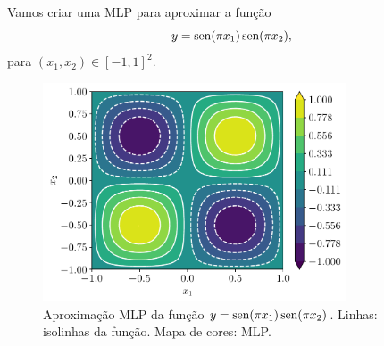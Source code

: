 Vamos criar uma MLP para aproximar a função
\begin{equation}
  y = \operatorname{sen}(\pi x_1)\operatorname{sen}(\pi x_2),
\end{equation}
para $(x_1, x_2) \in [-1, 1]^2$.

\begin{figure}[H]
  \centering
  \includegraphics[width=0.8\textwidth]{cap_mlp/dados/fig_mlp_apfun_2d/fig}
  \caption{Aproximação MLP da função $y = \operatorname{sen}(\pi x_1)\operatorname{sen}(\pi x_2)$. Linhas: isolinhas da função. Mapa de cores: MLP. }
  \label{fig:mlp_apfun_2d}
\end{figure}


